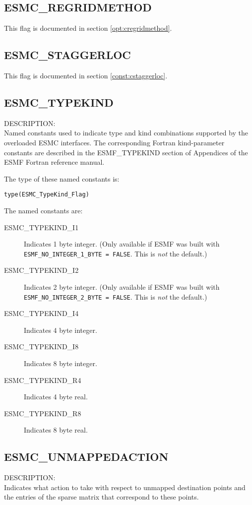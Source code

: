 \subsection{ESMC\_REGRIDMETHOD}
This flag is documented in section \ref{opt:cregridmethod}.

\subsection{ESMC\_STAGGERLOC}
This flag is documented in section \ref{const:cstaggerloc}.

\subsection{ESMC\_TYPEKIND}
\label{const:ctypekind}

{\sf DESCRIPTION:\\}
Named constants used to indicate type and kind combinations supported by the
overloaded ESMC interfaces. The corresponding Fortran kind-parameter constants 
are described in the ESMF\_TYPEKIND section of Appendices of the ESMF Fortran 
reference manual.

The type of these named constants is:

{\tt type(ESMC\_TypeKind\_Flag)}

The named constants are:
\begin{description}
\item [ESMC\_TYPEKIND\_I1]
      Indicates 1 byte integer. \newline 
      (Only available if ESMF was built with 
      {\tt ESMF\_NO\_INTEGER\_1\_BYTE = FALSE}. This is {\em not} the default.)
\item [ESMC\_TYPEKIND\_I2]
      Indicates 2 byte integer. \newline
      (Only available if ESMF was built with 
      {\tt ESMF\_NO\_INTEGER\_2\_BYTE = FALSE}. This is {\em not} the default.)
\item [ESMC\_TYPEKIND\_I4]
      Indicates 4 byte integer.
\item [ESMC\_TYPEKIND\_I8]
      Indicates 8 byte integer.
\item [ESMC\_TYPEKIND\_R4]
      Indicates 4 byte real.
\item [ESMC\_TYPEKIND\_R8]
      Indicates 8 byte real.
\end{description}

\subsection{ESMC\_UNMAPPEDACTION}
\label{const:unmappedaction}
{\sf DESCRIPTION:\\}
Indicates what action to take with respect to unmapped destination points
and the entries of the sparse matrix that correspond to these points.

